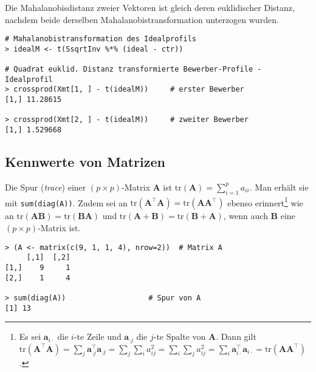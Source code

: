 Die Mahalanobisdistanz zweier Vektoren ist gleich deren euklidischer Distanz, nachdem beide derselben Mahalanobistransformation unterzogen wurden.
\begin{lstlisting}
# Mahalanobistransformation des Idealprofils
> idealM <- t(SsqrtInv %*% (ideal - ctr))

# Quadrat euklid. Distanz transformierte Bewerber-Profile - Idealprofil
> crossprod(Xmt[1, ] - t(idealM))     # erster Bewerber
[1,] 11.28615

> crossprod(Xmt[2, ] - t(idealM))     # zweiter Bewerber
[1,] 1.529668
\end{lstlisting}

\subsection{Kennwerte von Matrizen}
\label{sec:matProp}

Die Spur (\emph{trace}) einer $(p \times p)$-Matrix $\bm{A}$ ist $\text{tr}(\bm{A}) = \sum_{i=1}^{p} a_{ii}$. Man erhält sie mit \lstinline!sum(diag(A))!. Zudem sei an $\text{tr}(\bm{A}^{\top} \bm{A}) = \text{tr}(\bm{A} \bm{A}^{\top})$ ebenso erinnert\footnote{Es sei $\bm{a}_{i \cdot}$ die $i$-te Zeile und $\bm{a}_{\cdot j}$ die $j$-te Spalte von $\bm{A}$. Dann gilt $\text{tr}(\bm{A}^{\top} \bm{A}) = \sum_{j} \bm{a}_{\cdot j}^{\top} \bm{a}_{\cdot j} = \sum_{j} \sum_{i} a_{ij}^{2} = \sum_{i} \sum_{j} a_{ij}^{2} = \sum_{i} \bm{a}_{i \cdot}^{\top} \bm{a}_{i \cdot} = \text{tr}(\bm{A} \bm{A}^{\top})$.} wie an $\text{tr}(\bm{A} \bm{B}) = \text{tr}(\bm{B} \bm{A})$ und $\text{tr}(\bm{A} + \bm{B}) = \text{tr}(\bm{B} + \bm{A})$, wenn auch $\bm{B}$ eine $(p \times p)$-Matrix ist.
\begin{lstlisting}
> (A <- matrix(c(9, 1, 1, 4), nrow=2))  # Matrix A
     [,1]  [,2]
[1,]    9     1
[2,]    1     4

> sum(diag(A))                   # Spur von A
[1] 13
\end{lstlisting}

